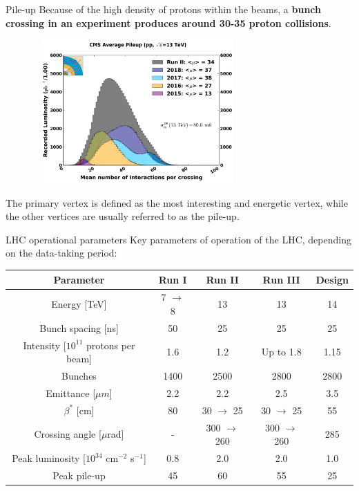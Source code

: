 \documentclass[8pt]{beamer}
\begin{document}
\begin{frame}{Pile-up}
\justifying
\vspace{5pt}
Because of the high density of protons within the beams, a \textbf{bunch crossing in an experiment produces around 30-35 proton collisions}. \vfill

\begin{figure}[htbp]
\begin{center}
\includegraphics[width=8cm, height=5.5cm]{figs/PUSummary.png}
\end{center}
\end{figure} \vfill

The \alert{primary vertex} is defined as the most interesting and energetic vertex, while the other vertices are usually referred to as the \alert{pile-up}. \vfill
\end{frame}

\begin{frame}{LHC operational parameters}
\justifying
\alert{Key parameters of operation} of the LHC, depending on the data-taking period:

\begin{table}
\begin{center}
\begin{tabular}{ c|c|c|c|c } 
 \hline
 Parameter & Run I & Run II & Run III & Design \\
\hline
Energy [TeV] & 7 $\rightarrow$ 8 & 13 & 13 & 14 \\
Bunch spacing [ns] & 50 & 25 & 25 & 25 \\
Intensity [$10^{11}$ protons per beam] & 1.6 & 1.2 & Up to 1.8 & 1.15 \\
Bunches & 1400 & 2500 & 2800 & 2800 \\
Emittance [$\mu m$] & 2.2 & 2.2 & 2.5 & 3.5 \\
$\beta^*$ [cm] & 80 & 30 $\rightarrow$ 25 & 30 $\rightarrow$ 25 & 55 \\
Crossing angle [$\mu$rad] & - & 300 $\rightarrow$ 260 & 300 $\rightarrow$ 260 & 285 \\
Peak luminosity [$10^{34}$ cm$^{-2}$ s$^{-1}$] & 0.8 & 2.0 & 2.0 & 1.0 \\
Peak pile-up & 45 & 60 & 55 & 25 \\
 \hline
\end{tabular}
\end{center}
\end{table}
\end{frame}
\end{document}
